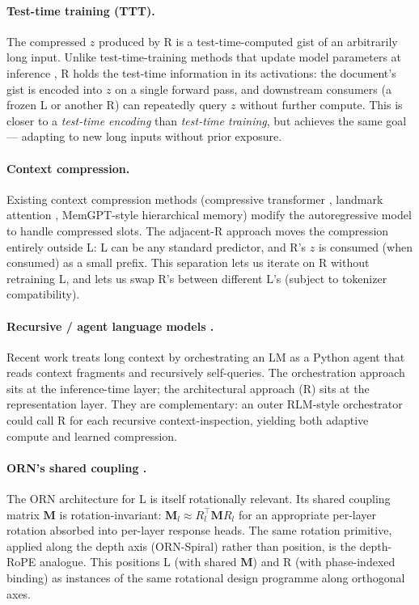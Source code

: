 \documentclass[10pt, twocolumn, a4paper]{article}
\newcommand{\M}{\mathbf{M}}
\begin{document}
\paragraph{Test-time training (TTT).} The compressed $z$ produced by R is a test-time-computed gist of an arbitrarily long input. Unlike test-time-training methods that update model parameters at inference \cite{sun2024ttt}, R holds the test-time information in its activations: the document's gist is encoded into $z$ on a single forward pass, and downstream consumers (a frozen L or another R) can repeatedly query $z$ without further compute. This is closer to a \emph{test-time encoding} than \emph{test-time training}, but achieves the same goal --- adapting to new long inputs without prior exposure.

\paragraph{Context compression.} Existing context compression methods (compressive transformer \cite{rae2019compressive}, landmark attention \cite{mohtashami2023landmark}, MemGPT-style hierarchical memory) modify the autoregressive model to handle compressed slots. The adjacent-R approach moves the compression entirely outside L: L can be any standard predictor, and R's $z$ is consumed (when consumed) as a small prefix. This separation lets us iterate on R without retraining L, and lets us swap R's between different L's (subject to tokenizer compatibility).

\paragraph{Recursive / agent language models \cite{zhang2026rlm}.} Recent work treats long context by orchestrating an LM as a Python agent that reads context fragments and recursively self-queries. The orchestration approach sits at the inference-time layer; the architectural approach (R) sits at the representation layer. They are complementary: an outer RLM-style orchestrator could call R for each recursive context-inspection, yielding both adaptive compute and learned compression.

\paragraph{ORN's shared coupling \cite{orn2026}.} The ORN architecture for L is itself rotationally relevant. Its shared coupling matrix $\M$ is rotation-invariant: $\M_l \approx R_l^\top \M R_l$ for an appropriate per-layer rotation absorbed into per-layer response heads. The same rotation primitive, applied along the depth axis (ORN-Spiral) rather than position, is the depth-RoPE analogue. This positions L (with shared $\M$) and R (with phase-indexed binding) as instances of the same rotational design programme along orthogonal axes.
\end{document}
